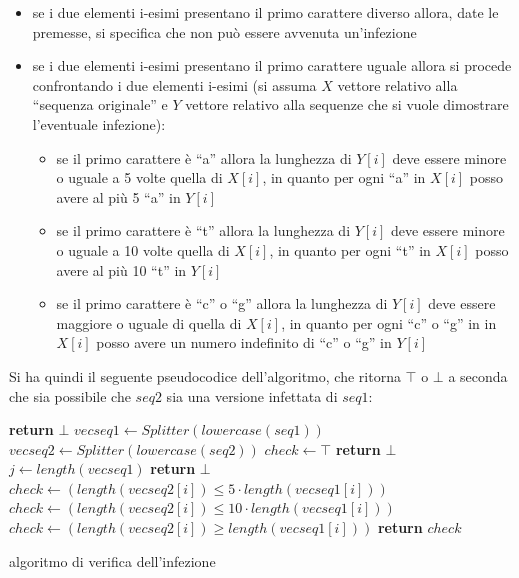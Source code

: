 \documentclass[a4paper,12pt, oneside]{book}
\begin{document}
\begin{itemize}
  \item se i due elementi i-esimi presentano il primo carattere diverso allora,
  date le premesse, si specifica che non può essere avvenuta un'infezione
  \item se i due elementi i-esimi presentano il primo carattere uguale allora si
  procede confrontando i due elementi i-esimi (si assuma $X$ vettore relativo
  alla ``sequenza originale'' e $Y$ vettore relativo alla sequenze che si vuole
  dimostrare l'eventuale infezione):
  \begin{itemize}
    \item se il primo carattere è ``a'' allora la lunghezza di $Y[i]$ deve
    essere minore o uguale a 5 volte quella di $X[i]$, in quanto per ogni ``a''
    in $X[i]$ posso avere al più 5 ``a'' in $Y[i]$
    \item se il primo carattere è ``t'' allora la lunghezza di $Y[i]$ deve
    essere minore o uguale a 10 volte quella di $X[i]$, in quanto per ogni ``t''
    in $X[i]$ posso avere al più 10 ``t'' in $Y[i]$
    \item se il primo carattere è ``c'' o ``g'' allora la lunghezza di $Y[i]$
    deve essere maggiore o uguale di quella di $X[i]$, in quanto per ogni ``c''
    o ``g'' in  in $X[i]$ posso avere un numero indefinito di ``c'' o ``g'' in
    $Y[i]$ 
  \end{itemize}
\end{itemize}
\newpage
Si ha quindi il seguente pseudocodice dell'algoritmo, che ritorna $\top$ o
$\bot$ a seconda che sia possibile che $seq2$ sia una versione infettata di
$seq1$:
\begin{algorithm}[H]
  \begin{algorithmic}[1]
    \State \textbf{return} $\bot$
    \EndIf
    \State $vecseq1\gets Splitter(lowercase(seq1))$
    \State $vecseq2\gets Splitter(lowercase(seq2))$
    \State $check \gets \top$
    \State \textbf{return} $\bot$
    \EndIf
    \State $j \gets length(vecseq1)$
    \State \textbf{return} $\bot$
    \EndIf
    \State $check \gets (length(vecseq2[i]) \leq 5\cdot length(vecseq1[i]))$
    \State $check \gets (length(vecseq2[i]) \leq 10\cdot length(vecseq1[i]))$
    \Else
    \State $check \gets (length(vecseq2[i]) \geq length(vecseq1[i]))$
    \EndIf
    \EndFor
    \State \textbf{return} $check$
    \EndFunction
  \end{algorithmic}
  \caption{algoritmo di verifica dell'infezione}
\end{algorithm}
\end{document}
